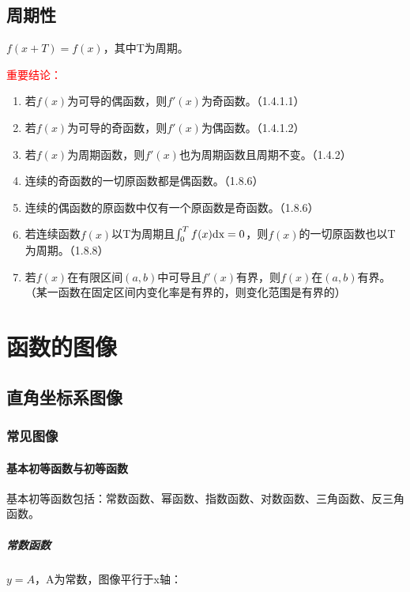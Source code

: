 \documentclass[UTF8, 12pt]{ctexart}
\begin{document}
\subsection{周期性}

$f(x+T)=f(x)$，其中T为周期。 \bigskip

\textcolor{red}{重要结论：}

\begin{enumerate}
    \item 若$f(x)$为可导的偶函数，则$f'(x)$为奇函数。（1.4.1.1）
    \item 若$f(x)$为可导的奇函数，则$f'(x)$为偶函数。（1.4.1.2）
    \item 若$f(x)$为周期函数，则$f'(x)$也为周期函数且周期不变。（1.4.2）
    \item 连续的奇函数的一切原函数都是偶函数。（1.8.6）
    \item 连续的偶函数的原函数中仅有一个原函数是奇函数。（1.8.6）
    \item 若连续函数$f(x)$以T为周期且$\int_{0}^{T}f(x)\rm{d}x=0$，则$f(x)$的一切原函数也以T为周期。（1.8.8）
    \item 若$f(x)$在有限区间$(a,b)$中可导且$f'(x)$有界，则$f(x)$在$(a,b)$有界。（某一函数在固定区间内变化率是有界的，则变化范围是有界的）
\end{enumerate}

\section{函数的图像}
\subsection{直角坐标系图像}
\subsubsection{常见图像}
\paragraph{基本初等函数与初等函数} \leavevmode \bigskip

基本初等函数包括：常数函数、幂函数、指数函数、对数函数、三角函数、反三角函数。

\subparagraph{常数函数} \leavevmode \bigskip

$y=A$，A为常数，图像平行于x轴：

\end{document}
